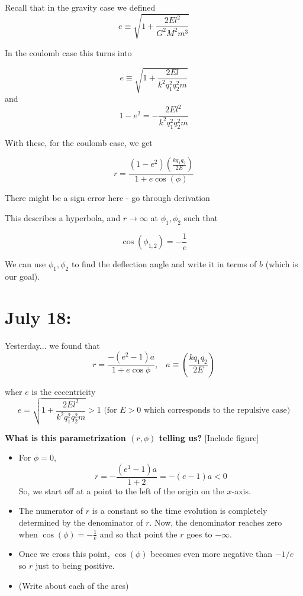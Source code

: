 \documentclass[11pt]{article}
\begin{document}
Recall that in the gravity case we defined 
\[ e \equiv \sqrt{1 + \frac{2E l^2}{G^2 M^2 m^3}} \]


In the coulomb case this turns into 

\[ e \equiv \sqrt{1 + \frac{2El}{k^2 q_1^2 q_2^2 m}} \]
and 
\[ 1 - e^2 = -\frac{2E l^2}{k^2 q_1^2 q_2^2 m} \]

With these, for the coulomb case, we get 

\[ \boxed{r = \frac{(1-e^2) \left(\frac{kq_1 q_2}{2E}\right) }{1+e\cos(\phi)} } \]

\begin{note}
  {There might be a sign error here - go through derivation}
\end{note}

This describes a hyperbola, and $r \rightarrow \infty$ at $\phi_1, \phi_2$ such that 

\[ \cos(\phi_{1,2}) = -\frac{1}{e}  \]

We can use $\phi_1, \phi_2$ to find the deflection angle and write it in terms of $b$ (which is our goal).

\pagebreak
\section{July 18: }

\vskip 1cm
Yesterday... we found that 
\[ r = \frac{-(e^2 - 1) a}{1 + e\cos\phi},\;\;\; a \equiv \left(\frac{kq_1 q_2}{2E}\right) \]

wher $e$ is the eccentricity
\[ e = \sqrt{1 + \frac{2El^2}{k^2 q_1^2 q_2^2 m}} > 1 \text{ (for $E > 0$ which corresponds to the repulsive case)}\]

\textbf{What is this parametrization $(r, \phi)$ telling us?
}
\vskip 0.5cm
[Include figure]
\vskip 0.5cm

\begin{itemize}
  \item For $\phi = 0$, 
  \[ r = - \frac{(e^1 - 1)a}{1 + 2} = -(e-1)a < 0 \]
  So, we start off at a point to the left of the origin on the $x$-axis. 

  \item The numerator of $r$ is a constant so the time evolution is completely determined by the denominator of $r$. Now, the denominator reaches zero when $\cos(\phi) = -\frac{1}{e}$ and so that point the $r$ goes to $-\infty$.
  
  \item Once we cross this point, $\cos(\phi)$ becomes even more negative than $-1/e$ so $r$ just to being positive.
  
  \item (Write about each of the arcs)
\end{itemize}
\end{document}
